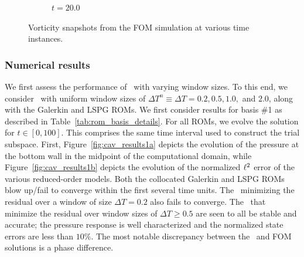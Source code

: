 \begin{figure}
\begin{center}
\begin{subfigure}[t]{0.49\textwidth}
\caption{$t=20.0$}
\end{subfigure}
\caption{Vorticity snapshots from the FOM simulation at various time instances.} 
\label{fig:fom_sols_cav}
\end{center}
\end{figure}


\subsubsection{Numerical results}
We first assess the performance of \methodAcronymROMs\ with varying window sizes. To this end, we consider \methodAcronymROMs\ with uniform window 
sizes of $\Delta T^n \equiv \Delta T = 0.2,0.5,1.0,$ and $2.0$, along with the Galerkin and LSPG ROMs. We first consider results for basis \#1 as described in 
Table~\ref{tab:rom_basis_details}. For all ROMs, we evolve 
the solution for $t \in [0,100]$. This comprises the same time interval used to construct the trial subspace. First, Figure~\ref{fig:cav_results1a} depicts the evolution of the pressure at the bottom wall in the midpoint of the computational domain, while Figure~\ref{fig:cav_results1b} depicts the evolution of the normalized $\ell^2$ error of the various reduced-order models. Both the collocated Galerkin and LSPG ROMs blow up/fail to converge within the first several time units. The \methodAcronymROM\ minimizing the residual over a window of size $\Delta T = 0.2$ also fails to converge. The \methodAcronymROMs\ that minimize the residual over window sizes of $\Delta T \ge 0.5$ are seen to all be stable and accurate; the pressure response is well characterized and the normalized state errors are less than $10\%$. The most notable discrepancy between the \methodAcronymROM\ and FOM solutions is a phase difference. 






